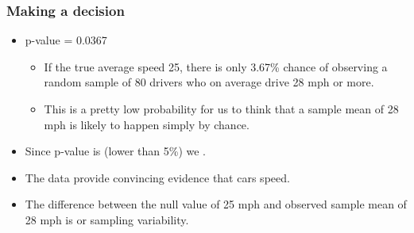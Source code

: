 
\begin{frame}
\frametitle{Making a decision}

\begin{itemize}

\item p-value = 0.0367

\pause

\begin{itemize}
\item If the true average speed 25, there is only 3.67\% chance of observing a random sample of 80 drivers who on average drive 28 mph or more.
\pause
\item This is a pretty low probability for us to think that a sample mean of 28 mph is likely to happen simply by chance.
\end{itemize}

\pause
\item Since p-value is  (lower than 5\%) we .

\pause
\item The data provide convincing evidence that cars speed.

\pause
\item The difference between the null value of 25 mph and observed sample mean of 28 mph is  or sampling variability.

\end{itemize}

\end{frame}


